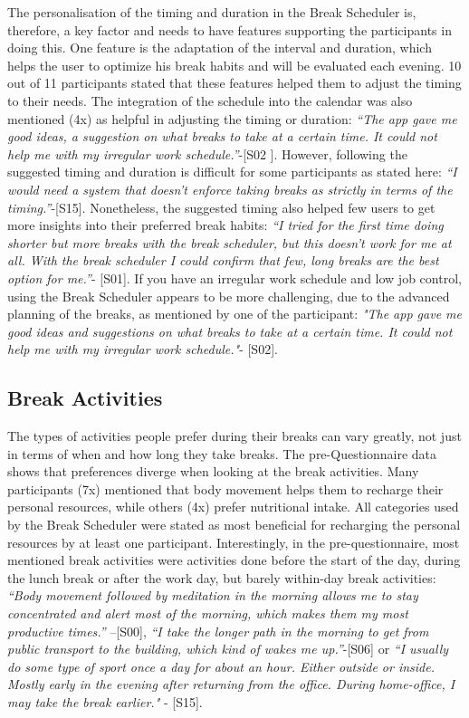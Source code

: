 \documentclass{hasel_thesis}
\begin{document}
The personalisation of the timing and duration in the Break Scheduler is, therefore, a key factor and needs to have features supporting the participants in doing this. One feature is the adaptation of the interval and duration, which helps the user to optimize his break habits and will be evaluated each evening. 10 out of 11 participants stated that these features helped them to adjust the timing to their needs. The integration of the schedule into the calendar was also mentioned (4x) as helpful in adjusting the timing or duration: \textit{“The app gave me good ideas, a suggestion on what breaks to take at a certain time. It could not help me with my irregular work schedule.”}-[S02 ]. However, following the suggested timing and duration is difficult for some participants as stated here: \textit{“I would need a system that doesn't enforce taking breaks as strictly in terms of the timing.”}-[S15]. Nonetheless, the suggested timing also helped few users to get more insights into their preferred break habits: \textit{“I tried for the first time doing shorter but more breaks with the break scheduler, but this doesn't work for me at all. With the break scheduler I could confirm that few, long breaks are the best option for me.”}- [S01]. If you have an irregular work schedule and low job control, using the Break Scheduler appears to be more challenging, due to the advanced planning of the breaks, as mentioned by one of the participant: \textit{"The app gave me good ideas and suggestions on what breaks to take at a certain time. It could not help me with my irregular work schedule."}- [S02]. 

\subsection{Break Activities} \label{activities_difference}
The types of activities people prefer during their breaks can vary greatly, not just in terms of when and how long they take breaks. The pre-Questionnaire data shows that preferences diverge when looking at the break activities. Many participants (7x) mentioned that body movement helps them to recharge their personal resources, while others (4x) prefer nutritional intake. All categories used by the Break Scheduler were stated as most beneficial for recharging the personal resources by at least one participant. Interestingly, in the pre-questionnaire, most mentioned break activities were activities done before the start of the day, during the lunch break or after the work day, but barely within-day break activities: \textit{“Body movement followed by meditation in the morning allows me to stay concentrated and alert most of the morning, which makes them my most productive times.”} –[S00],  \textit{“I take the longer path in the morning to get from public transport to the building, which kind of wakes me up.”}-[S06] or \textit{“I usually do some type of sport once a day for about an hour. Either outside or inside. Mostly early in the evening after returning from the office. During home-office, I may take the break earlier."} - [S15]. 
\end{document}
